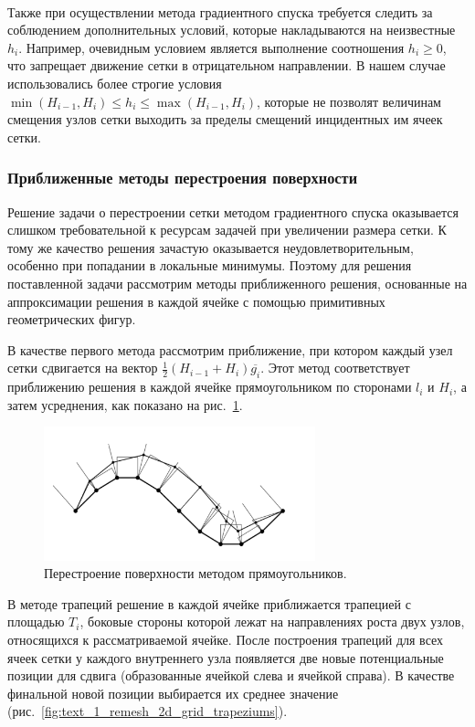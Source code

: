 \

Также при осуществлении метода градиентного спуска требуется следить за соблюдением дополнительных условий, которые накладываются на неизвестные $h_i$.
Например, очевидным условием является выполнение соотношения $h_i \ge 0$, что запрещает движение сетки в отрицательном направлении.
В нашем случае использовались более строгие условия $\min(H_{i - 1}, H_i) \le h_i \le \max(H_{i - 1}, H_i)$, которые не позволят величинам смещения узлов сетки выходить за пределы смещений инцидентных им ячеек сетки.

\subsubsection{Приближенные методы перестроения поверхности}

Решение задачи о перестроении сетки методом градиентного спуска оказывается слишком требовательной к ресурсам задачей при увеличении размера сетки.
К тому же качество решения зачастую оказывается неудовлетворительным, особенно при попадании в локальные минимумы.
Поэтому для решения поставленной задачи рассмотрим методы приближенного решения, основанные на аппроксимации решения в каждой ячейке с помощью примитивных геометрических фигур.

В качестве первого метода рассмотрим приближение, при котором каждый узел сетки сдвигается на вектор $\frac{1}{2}(H_{i - 1} + H_i)\overline{g_i}$.
Этот метод соответствует приближению решения в каждой ячейке прямоугольником по сторонами $l_i$ и $H_i$, а затем усреднения, как показано на рис.~\ref{fig:text_1_remesh_2d_grid_rectangles}.

\begin{figure}[h]
\onelinecaptionstrue
\centering
\includegraphics[width=0.7\textwidth]{pics/text_1_remesh_2d/grid_rectangles.pdf}
\caption{Перестроение поверхности методом прямоугольников.}
\label{fig:text_1_remesh_2d_grid_rectangles}
\end{figure}

В методе трапеций решение в каждой ячейке приближается трапецией с площадью $T_i$, боковые стороны которой лежат на направлениях роста двух узлов, относящихся к рассматриваемой ячейке.
После построения трапеций для всех ячеек сетки у каждого внутреннего узла появляется две новые потенциальные позиции для сдвига (образованные ячейкой слева и ячейкой справа).
В качестве финальной новой позиции выбирается их среднее значение (рис.~\ref{fig:text_1_remesh_2d_grid_trapeziums}).


